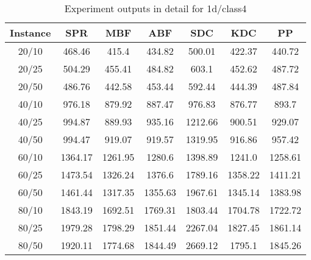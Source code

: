 \begin{table}[ht!]
    \caption{Experiment outputs in detail for 1d/class4}
    \centering
    \begin{tabular}{@{}ccccccc@{}}
        \toprule
        {\bfseries Instance} & {\bfseries SPR} & {\bfseries MBF}
        & {\bfseries ABF} & {\bfseries SDC} & {\bfseries KDC} & {\bfseries PP}\\
        \midrule
        20/10 & 468.46 & 415.4 & 434.82 & 500.01 & 422.37 & 440.72\\
        20/25 & 504.29 & 455.41 & 484.82 & 603.1 & 452.62 & 487.72\\
        20/50 & 486.76 & 442.58 & 453.44 & 592.44 & 444.39 & 487.84\\
        40/10 & 976.18 & 879.92 & 887.47 & 976.83 & 876.77 & 893.7\\
        40/25 & 994.87 & 889.93 & 935.16 & 1212.66 & 900.51 & 929.07\\
        40/50 & 994.47 & 919.07 & 919.57 & 1319.95 & 916.86 & 957.42\\
        60/10 & 1364.17 & 1261.95 & 1280.6 & 1398.89 & 1241.0 & 1258.61\\
        60/25 & 1473.54 & 1326.24 & 1376.6 & 1789.16 & 1358.22 & 1411.21\\
        60/50 & 1461.44 & 1317.35 & 1355.63 & 1967.61 & 1345.14 & 1383.98\\
        80/10 & 1843.19 & 1692.51 & 1769.31 & 1803.44 & 1704.78 & 1722.72\\
        80/25 & 1979.28 & 1798.29 & 1851.44 & 2267.04 & 1827.45 & 1861.14\\
        80/50 & 1920.11 & 1774.68 & 1844.49 & 2669.12 & 1795.1 & 1845.26\\
        \bottomrule
    \end{tabular}
\end{table}
